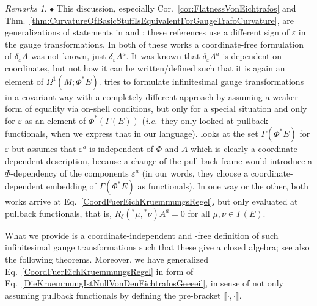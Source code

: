 \documentclass[a4paper,oneside,11pt]{scrartcl} %
\theoremstyle{plain}
\theoremstyle{remark}
\newtheorem{remark}[theorem]{Remarks}
\theoremstyle{definition}
\begin{document}
\begin{remark}\label{RemarkUeberNablaRhoCurvatureForGauegTrafo}
\leavevmode\newline
\indent $\bullet$ This discussion, especially Cor.~\ref{cor:FlatnessVonEichtrafos} and Thm.~\ref{thm:CurvatureOfBasicStuffIsEquivalentForGaugeTrafoCurvature}, are generalizations of statements in \cite[especially Prop.~8 and Thm.~1]{EichtrafoKruemmungUrspruenglich} and \cite[especially Eq.~9, 10 and 11; there the $S$ denotes the basic curvature]{mayerlieAuchEichtrafoStuff}; these references use a different sign of $\varepsilon$ in the gauge transformations.
In both of these works a coordinate-free formulation of $\delta_\varepsilon A$ was not known, just $\delta_\varepsilon A^a$. It was known that $\delta_\varepsilon A^a$ is dependent on coordinates, but not how it can be written/defined such that it is again an element of $\Omega^1(M; \Phi^*E)$. \cite{EichtrafoKruemmungUrspruenglich} tries to formulate infinitesimal gauge transformations in a covariant way with a completely different approach by assuming a weaker form of equality via on-shell conditions, but only for a special situation and only for $\varepsilon$ as an element of $\Phi^*(\Gamma(E))$ (\textit{i.e.}~they only looked at pullback functionals, when we express that in our language). \cite{mayerlieAuchEichtrafoStuff} looks at the set $\Gamma(\Phi^*E)$ for $\varepsilon$ but assumes that $\varepsilon^a$ is independent of $\Phi$ and $A$ which is clearly a coordinate-dependent description, because a change of the pull-back frame would introduce a $\Phi$-dependency of the components $\varepsilon^a$ (in our words, they choose a coordinate-dependent embedding of $\Gamma(\Phi^*E)$ as functionals). In one way or the other, both works arrive at Eq.~\eqref{CoordFuerEichKruemmungsRegel}, but only evaluated at pullback functionals, that is, $R_\delta({}^*\mu, {}^*\nu)A^a=0$ for all $\mu, \nu \in \Gamma(E)$.

What we provide is a coordinate-independent and -free definition of such infinitesimal gauge transformations such that these give a closed algebra; see also the following theorems. Moreover, we have generalized Eq.~\eqref{CoordFuerEichKruemmungsRegel} in form of Eq.~\eqref{DieKruemmungIstNullVonDenEichtrafosGeeeeil}, in sense of not only assuming pullback functionals by defining the pre-bracket $\llbracket \cdot, \cdot \rrbracket$.


\end{remark}
\end{document}

